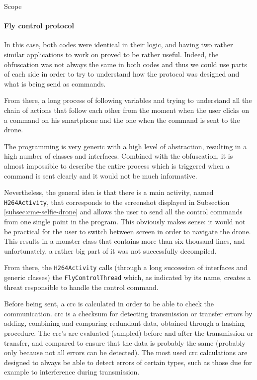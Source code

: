 \begin{chaptercover}{Scope}
\paragraph{Fly control protocol} In this case, both codes were identical in their logic, and having two rather similar applications to work on proved to be rather useful. Indeed, the obfuscation was not always the same in both codes and thus we could use parts of each side in order to try to understand how the protocol was designed and what is being send as commands.

From there, a long process of following variables and trying to understand all the chain of actions that follow each other from the moment when the user clicks on a command on his smartphone and the one when the command is sent to the drone.

The programming is very generic with a high level of abstraction, resulting in a high number of classes and interfaces. Combined with the obfuscation, it is almost impossible to describe the entire process which is triggered when a command is sent clearly and it would not be much informative.

Nevertheless, the general idea is that there is a main activity, named \texttt{H264Activity}, that corresponds to the screenshot displayed in Subsection \ref{subsec:cme-selfie-drone} and allows the user to send all the control commands from one single point in the program. This obviously makes sense: it would not be practical for the user to switch between screen in order to navigate the drone. This results in a monster class that contains more than six thousand lines, and unfortunately, a rather big part of it was not successfully decompiled.

From there, the \texttt{H264Activity} calls (through a long succession of interfaces and generic classes) the \texttt{FlyControlThread} which, as indicated by its name, creates a threat responsible to handle the control command.

Before being sent, a \acrfull{crc} is calculated in order to be able to check the communication. \acrshort{crc} is a checksum for detecting transmission or transfer errors by adding, combining and comparing redundant data, obtained through a hashing procedure. The \acrshort{crc}'s are evaluated (sampled) before and after the transmission or transfer, and compared to ensure that the data is probably the same (probably only because not all errors can be detected). The most used \acrshort{crc} calculations are designed to always be able to detect errors of certain types, such as those due for example to interference during transmission.


\end{chaptercover}
